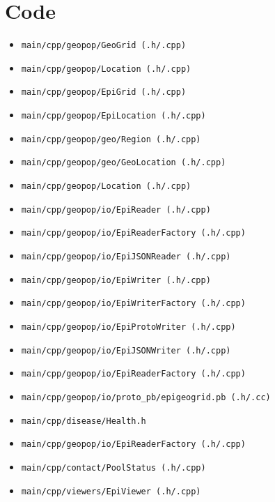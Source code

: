 \documentclass[runningheads]{llncs}
\begin{document}
\section{Code}
	\begin{itemize}
		\item \texttt{main/cpp/geopop/GeoGrid (.h/.cpp)}
		\item \texttt{main/cpp/geopop/Location (.h/.cpp)}
		\item \texttt{main/cpp/geopop/EpiGrid (.h/.cpp)}
		\item \texttt{main/cpp/geopop/EpiLocation (.h/.cpp)}
		\item \texttt{main/cpp/geopop/geo/Region (.h/.cpp)}
		\item \texttt{main/cpp/geopop/geo/GeoLocation (.h/.cpp)}
		\item \texttt{main/cpp/geopop/Location (.h/.cpp)}
		\item \texttt{main/cpp/geopop/io/EpiReader (.h/.cpp)}
		\item \texttt{main/cpp/geopop/io/EpiReaderFactory (.h/.cpp)}
		\item \texttt{main/cpp/geopop/io/EpiJSONReader (.h/.cpp)}
		\item \texttt{main/cpp/geopop/io/EpiWriter (.h/.cpp)}
		\item \texttt{main/cpp/geopop/io/EpiWriterFactory (.h/.cpp)}
		\item \texttt{main/cpp/geopop/io/EpiProtoWriter (.h/.cpp)}
		\item \texttt{main/cpp/geopop/io/EpiJSONWriter (.h/.cpp)}
		\item \texttt{main/cpp/geopop/io/EpiReaderFactory (.h/.cpp)}
		\item \texttt{main/cpp/geopop/io/proto\_pb/epigeogrid.pb (.h/.cc)}
		\item \texttt{main/cpp/disease/Health.h}
		\item \texttt{main/cpp/geopop/io/EpiReaderFactory (.h/.cpp)}
		\item \texttt{main/cpp/contact/PoolStatus (.h/.cpp)}
		\item \texttt{main/cpp/viewers/EpiViewer (.h/.cpp)}
	\end{itemize}
\end{document}
